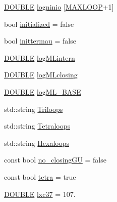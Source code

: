 \begin{DoxyCompactItemize}
\item 
\hyperlink{energy__const_8hh_a8747af38b86aa2bbcda2f1b1aa0888c2}{D\+O\+U\+B\+L\+E} \hyperlink{namespace_rfold_1_1_parameter_a880a22df5673fc8ed0dba9c1d0e7a36e}{logninio} \mbox{[}\hyperlink{energy__const_8hh_ad1bd6eabac419670ddd3c9ed82145988}{M\+A\+X\+L\+O\+O\+P}+1\mbox{]}
\item 
bool \hyperlink{namespace_rfold_1_1_parameter_a34bb77f761084f77aeb4768d23fac3a1}{initialized} = false
\item 
bool \hyperlink{namespace_rfold_1_1_parameter_a634f9d3c0bb311c6f2fe39b7f32796d2}{inittermau} = false
\item 
\hyperlink{energy__const_8hh_a8747af38b86aa2bbcda2f1b1aa0888c2}{D\+O\+U\+B\+L\+E} \hyperlink{namespace_rfold_1_1_parameter_aaffae10e935dbf949ce31229a2573784}{log\+M\+Lintern}
\item 
\hyperlink{energy__const_8hh_a8747af38b86aa2bbcda2f1b1aa0888c2}{D\+O\+U\+B\+L\+E} \hyperlink{namespace_rfold_1_1_parameter_a22fb8df2af1e1956624ab4922f582eaa}{log\+M\+Lclosing}
\item 
\hyperlink{energy__const_8hh_a8747af38b86aa2bbcda2f1b1aa0888c2}{D\+O\+U\+B\+L\+E} \hyperlink{namespace_rfold_1_1_parameter_a2b0d9f5b89c56cb544abf4400549e6bf}{log\+M\+L\+\_\+\+B\+A\+S\+E}
\item 
std\+::string \hyperlink{namespace_rfold_1_1_parameter_ad65b27d73071fca1621f7f0cb02cacbc}{Triloops}
\item 
std\+::string \hyperlink{namespace_rfold_1_1_parameter_aae84b42c9bbd350811296e721cf54d34}{Tetraloops}
\item 
std\+::string \hyperlink{namespace_rfold_1_1_parameter_a04c094fec1c14c49a01196be486d4883}{Hexaloops}
\item 
const bool \hyperlink{namespace_rfold_1_1_parameter_a312a98d9462d203bcef26ce195b94bca}{no\+\_\+closing\+G\+U} = false
\item 
const bool \hyperlink{namespace_rfold_1_1_parameter_a38a90dcb0eaf3b35fbed6230d5f8a389}{tetra} = true
\item 
\hyperlink{energy__const_8hh_a8747af38b86aa2bbcda2f1b1aa0888c2}{D\+O\+U\+B\+L\+E} \hyperlink{namespace_rfold_1_1_parameter_a342cc90fdcdcc468a3c7f0817dd5e78d}{lxc37} = 107.
\end{DoxyCompactItemize}



